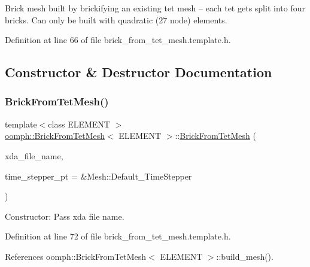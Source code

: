 Brick mesh built by brickifying an existing tet mesh -- each tet gets split into four bricks. Can only be built with quadratic (27 node) elements. 

Definition at line 66 of file brick\+\_\+from\+\_\+tet\+\_\+mesh.\+template.\+h.



\subsection{Constructor \& Destructor Documentation}
\mbox{\label{classoomph_1_1BrickFromTetMesh_abed00a445cc3c6b6cc00d32e0db4a366}} 
\subsubsection{\texorpdfstring{Brick\+From\+Tet\+Mesh()}{BrickFromTetMesh()}\hspace{0.1cm}{\footnotesize\ttfamily [1/3]}}
{\footnotesize\ttfamily template$<$class E\+L\+E\+M\+E\+NT $>$ \\
\hyperlink{classoomph_1_1BrickFromTetMesh}{oomph\+::\+Brick\+From\+Tet\+Mesh}$<$ E\+L\+E\+M\+E\+NT $>$\+::\hyperlink{classoomph_1_1BrickFromTetMesh}{Brick\+From\+Tet\+Mesh} (\begin{DoxyParamCaption}\item[{const std\+::string}]{xda\+\_\+file\+\_\+name,  }\item[{Time\+Stepper $\ast$}]{time\+\_\+stepper\+\_\+pt = {\ttfamily \&Mesh\+:\+:Default\+\_\+TimeStepper} }\end{DoxyParamCaption})\hspace{0.3cm}{\ttfamily [inline]}}



Constructor\+: Pass xda file name. 



Definition at line 72 of file brick\+\_\+from\+\_\+tet\+\_\+mesh.\+template.\+h.



References oomph\+::\+Brick\+From\+Tet\+Mesh$<$ E\+L\+E\+M\+E\+N\+T $>$\+::build\+\_\+mesh().

\mbox{\label{classoomph_1_1BrickFromTetMesh_af05fe6ff520986d7794c467fc1885f92}} 
